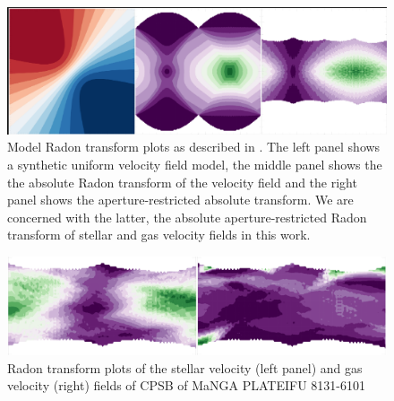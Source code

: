\begin{figure}
    \centering
   	\includegraphics[width=\columnwidth]{images/RadonPlots/example2.png}
    \caption{Model Radon transform plots as described in \citet{2018MNRAS.480.2217S}. The left panel shows a synthetic uniform velocity field model, the middle panel shows the the absolute Radon transform of the velocity field and the right panel shows the aperture-restricted absolute transform. We are concerned with the latter, the absolute aperture-restricted  Radon transform of stellar and gas velocity fields in this work.}
    \label{fig:Radon}
\end{figure}


\begin{figure}
    \centering
   	\includegraphics[width=\columnwidth]{images/RadonPlots/RT-snips/CPSB-8313-6101-RT-snip.png}
    \caption{Radon transform plots of the stellar velocity (left panel) and gas velocity (right) fields of CPSB of MaNGA PLATEIFU 8131-6101}
    \label{fig:RT_8131-6101}
\end{figure}

